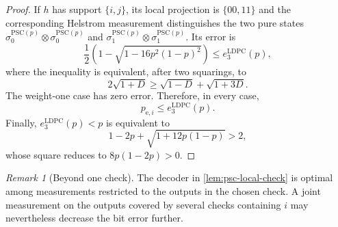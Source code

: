 \documentclass[11pt]{article}
\renewcommand{\leq}{\leqslant}
\renewcommand{\geq}{\geqslant}
\theoremstyle{remark}
\newtheorem{remark}{Remark}[section]
\newcommand{\PSC}{\mathrm{PSC}}
\begin{document}
\begin{proof}
If $h$ has support $\{i,j\}$, its local projection is $\{00,11\}$ and the corresponding Helstrom measurement distinguishes the two pure states $\sigma_0^{\PSC(p)} \otimes \sigma_0^{\PSC(p)}$ and $\sigma_1^{\PSC(p)} \otimes \sigma_1^{\PSC(p)}$. Its error is
\begin{equation*}
\frac{1}{2}\left(1-\sqrt{1-16p^2(1-p)^2}\right)
\leq e_3^{\mathrm{LDPC}}(p),
\end{equation*}
where the inequality is equivalent, after two squarings, to
\begin{equation*}
2\sqrt{1+D}
\geq
\sqrt{1-D}+\sqrt{1+3D}.
\end{equation*}
The weight-one case has zero error. Therefore, in every case,
\begin{equation*}
p_{\mathrm{e},i}
\leq e_3^{\mathrm{LDPC}}(p).
\end{equation*}
Finally, $e_3^{\mathrm{LDPC}}(p) < p$ is equivalent to
\begin{equation*}
1-2p+\sqrt{1+12p(1-p)} > 2,
\end{equation*}
whose square reduces to $8p(1-2p) > 0$.\qedhere
\end{proof}

\begin{remark}[Beyond one check]
\label{rem:local-decoder-optimality}
The decoder in \cref{lem:psc-local-check} is optimal among measurements restricted to the outputs in the chosen check. A joint measurement on the outputs covered by several checks containing $i$ may nevertheless decrease the bit error further.
\end{remark}
\end{document}
